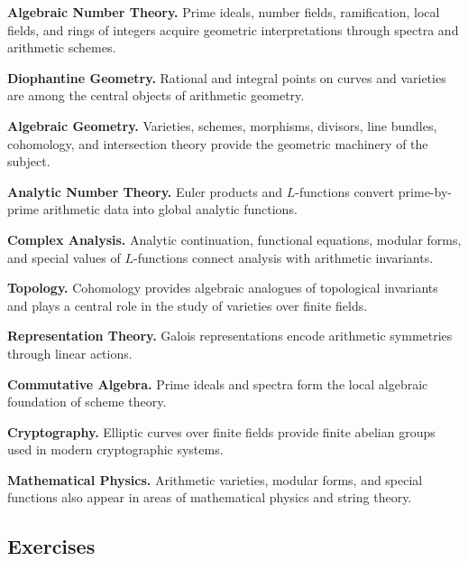 \begin{applicationbox}
\textbf{Algebraic Number Theory.}
Prime ideals, number fields, ramification, local fields, and rings of
integers acquire geometric interpretations through spectra and arithmetic
schemes.

\medskip

\textbf{Diophantine Geometry.}
Rational and integral points on curves and varieties are among the central
objects of arithmetic geometry.

\medskip

\textbf{Algebraic Geometry.}
Varieties, schemes, morphisms, divisors, line bundles, cohomology, and
intersection theory provide the geometric machinery of the subject.

\medskip

\textbf{Analytic Number Theory.}
Euler products and \(L\)-functions convert prime-by-prime arithmetic data
into global analytic functions.

\medskip

\textbf{Complex Analysis.}
Analytic continuation, functional equations, modular forms, and special
values of \(L\)-functions connect analysis with arithmetic invariants.

\medskip

\textbf{Topology.}
Cohomology provides algebraic analogues of topological invariants and plays
a central role in the study of varieties over finite fields.

\medskip

\textbf{Representation Theory.}
Galois representations encode arithmetic symmetries through linear actions.

\medskip

\textbf{Commutative Algebra.}
Prime ideals and spectra form the local algebraic foundation of scheme
theory.

\medskip

\textbf{Cryptography.}
Elliptic curves over finite fields provide finite abelian groups used in
modern cryptographic systems.

\medskip

\textbf{Mathematical Physics.}
Arithmetic varieties, modular forms, and special functions also appear in
areas of mathematical physics and string theory.
\end{applicationbox}

\subsection{Exercises}
\label{subsec:arithmetic-geometry-exercises}

